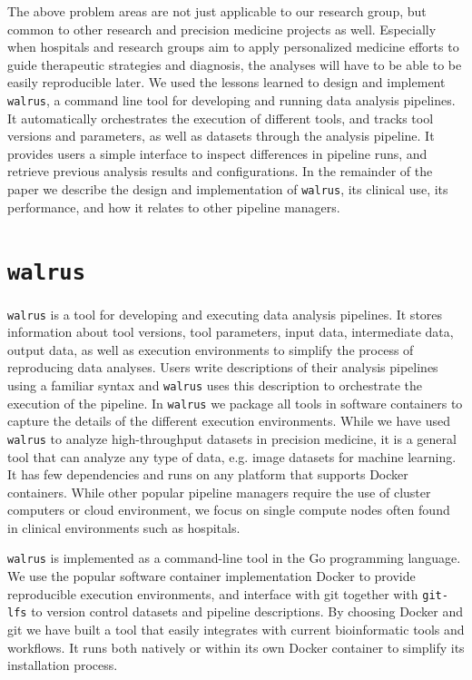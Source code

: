 The above problem areas are not just applicable to our research group, but
common to other research and precision medicine projects as well. Especially
when hospitals and research groups aim to apply personalized medicine efforts to
guide therapeutic strategies and diagnosis, the analyses will have to be able to
be easily reproducible later. We used the lessons learned to  design and
implement \texttt{walrus}, a command line tool for developing and running data
analysis pipelines. It automatically orchestrates the execution of different
tools, and tracks tool versions and parameters, as well as datasets through the
analysis pipeline. It provides users a simple interface to inspect differences
in pipeline runs, and retrieve previous analysis results and configurations. In
the remainder of the paper we describe the design and implementation of
\texttt{walrus}, its clinical use, its performance, and how it relates to other
pipeline managers. 

\section{\texttt{walrus}} 
\texttt{walrus} is a tool for developing and executing data analysis pipelines.
It stores information about tool versions, tool parameters, input data,
intermediate data, output data, as well as execution environments to simplify
the process of reproducing data analyses. Users write descriptions of their
analysis pipelines using a familiar syntax and \texttt{walrus}  uses this
description to orchestrate the execution of the pipeline. In \texttt{walrus}  we
package all tools in software containers to capture the details of the different
execution environments. While we have used \texttt{walrus} to analyze
high-throughput datasets in precision medicine, it is a general tool that can
analyze any type of data, e.g. image datasets for machine learning. It has few
dependencies and runs on any platform that supports Docker containers. While
other popular pipeline managers require the use of cluster computers or cloud
environment, we focus on single compute nodes often found in clinical
environments such as hospitals. 

\texttt{walrus} is implemented as a command-line tool in the Go programming
language. We use the popular software container implementation
Docker\cite{docker} to provide reproducible execution environments, and
interface with git together with \texttt{git-lfs}\cite{gitlfs} to version control
datasets and pipeline descriptions. By choosing Docker and git we have built a
tool that easily integrates with current bioinformatic tools and workflows. It
runs both natively or within its own Docker container to simplify its
installation process.


